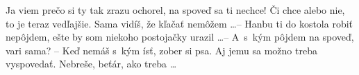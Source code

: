 Ja viem prečo si ty tak zrazu ochorel, na spoveď sa ti nechce! Či chce alebo
nie, to je teraz vedľajšie. Sama vidíš, že kľačať nemôžem \dots -- Hanbu ti
do kostola robiť nepôjdem, ešte by som niekoho postojačky urazil \dots --
A~s~kým pôjdem na spoveď, vari sama? -- Keď nemáš s~kým ísť, zober si psa. Aj
jemu sa možno treba vyspovedať. Nebreše, beťár, ako treba \dots
